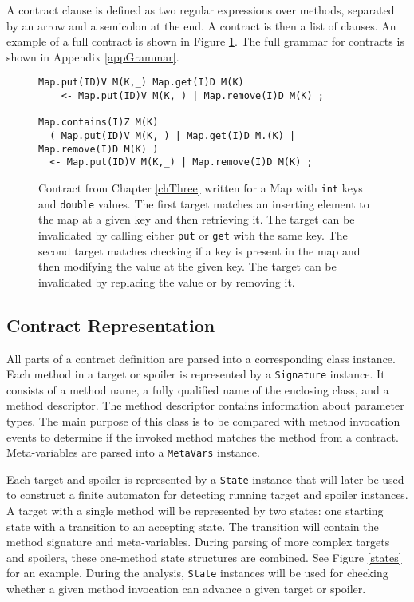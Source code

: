 A contract clause is defined as two regular expressions over methods, separated
by an arrow and a semicolon at the end. A contract is then a list of clauses. An
example of a full contract is shown in Figure \ref{contract}. The full grammar
for contracts is shown in Appendix \ref{appGrammar}.

\begin{figure}[hbt]
    \label{contract}
    \begin{lstlisting}
Map.put(ID)V M(K,_) Map.get(I)D M(K)
    <- Map.put(ID)V M(K,_) | Map.remove(I)D M(K) ;

Map.contains(I)Z M(K)
  ( Map.put(ID)V M(K,_) | Map.get(I)D M.(K) | Map.remove(I)D M(K) )
  <- Map.put(ID)V M(K,_) | Map.remove(I)D M(K) ;
\end{lstlisting}
    \caption{Contract from Chapter \ref{chThree} written for a Map with
    \texttt{int} keys and \texttt{double} values. The first target matches an
    inserting element to the map at a given key and then retrieving it. The
    target can be invalidated by calling either \texttt{put} or \texttt{get}
    with the same key. The second target matches checking if a key is present in
    the map and then modifying the value at the given key. The target can be
    invalidated by replacing the value or by removing it.}
\end{figure}

\subsection{Contract Representation}
All parts of a contract definition are parsed into a corresponding class
instance. Each method in a target or spoiler is represented by a
\texttt{Signature} instance. It consists of a method name, a fully qualified
name of the enclosing class, and a method descriptor. The method descriptor
contains information about parameter types. The main purpose of this class is to
be compared with method invocation events to determine if the invoked method
matches the method from a contract. Meta-variables are parsed into a
\texttt{MetaVars} instance.

Each target and spoiler is represented by a \texttt{State} instance that will
later be used to construct a finite automaton for detecting running target and
spoiler instances. A target with a single method will be represented by two
states: one starting state with a transition to an accepting state. The
transition will contain the method signature and meta-variables. During parsing
of more complex targets and spoilers, these one-method state structures are
combined. See Figure \ref{states} for an example. During the analysis,
\texttt{State} instances will be used for checking whether a given method
invocation can advance a given target or spoiler.

